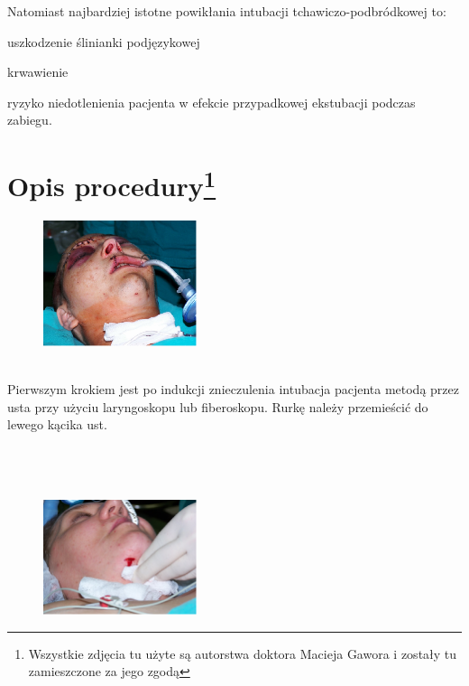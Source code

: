 \documentclass[a4paper, 12pt]{report}
\begin{document}
Natomiast najbardziej istotne powikłania intubacji
tchawiczo-podbródkowej to:
\begin{inparaenum}
\item uszkodzenie ślinianki podjęzykowej
\item krwawienie
\item ryzyko niedotlenienia pacjenta w efekcie przypadkowej ekstubacji
  podczas zabiegu.
\end{inparaenum}


\section*{Opis procedury\footnote{Wszystkie zdjęcia tu użyte są
  autorstwa doktora Macieja Gawora i zostały tu zamieszczone za jego zgodą}}

\begin{figure}
\includegraphics[width=0.4\textwidth]{images/itp1}
\end{figure}
\hfill\\
Pierwszym krokiem jest po indukcji znieczulenia intubacja pacjenta
metodą przez usta przy użyciu laryngoskopu lub fiberoskopu. Rurkę
należy przemieścić do lewego kącika ust.
\hfill\\
\hfill\\
\hfill\\
\hfill\\

\begin{figure}
\includegraphics[width=0.4\textwidth]{images/itp2}
\end{figure}
\end{document}
